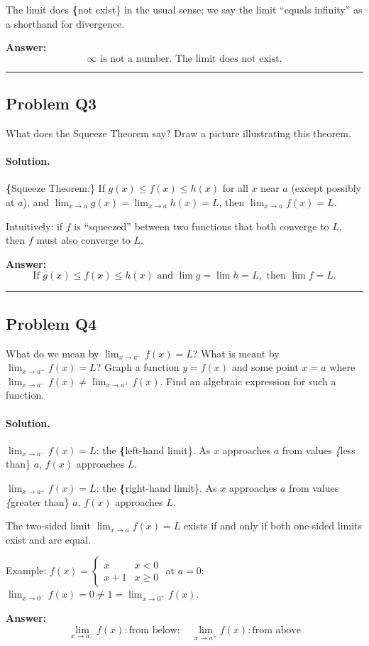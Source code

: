 \documentclass[12pt, a4paper]{article}
\newcommand{\problem}[1]{\subsection*{Problem #1}}
\newcommand{\solution}{\paragraph{Solution.}}
\begin{document}
The limit does \textbf\{not exist\} in the usual sense; we say the limit ``equals infinity'' as a shorthand for divergence.

\textbf{Answer:}
\[\infty \text{ is not a number. The limit does not exist.}\]

\vspace{1em}
\hrule
\vspace{1em}

\problem{Q3}

What does the Squeeze Theorem say? Draw a picture illustrating this theorem.

\solution

\textbf\{Squeeze Theorem:\} If $g(x) \le f(x) \le h(x)$ for all $x$ near $a$ (except possibly at $a$), and $\lim_{x \to a} g(x) = \lim_{x \to a} h(x) = L$, then $\lim_{x \to a} f(x) = L$.

Intuitively: if $f$ is ``squeezed'' between two functions that both converge to $L$, then $f$ must also converge to $L$.

\textbf{Answer:}
\[\text{If } g(x) \le f(x) \le h(x) \text{ and } \lim g = \lim h = L, \text{ then } \lim f = L.\]

\vspace{1em}
\hrule
\vspace{1em}

\problem{Q4}

What do we mean by $\lim_{x \to a^-} f(x) = L$? What is meant by $\lim_{x \to a^+} f(x) = L$? Graph a function $y = f(x)$ and some point $x = a$ where $\lim_{x \to a^-} f(x) \neq \lim_{x \to a^+} f(x)$. Find an algebraic expression for such a function.

\solution

$\lim_{x \to a^-} f(x) = L$: the \textbf\{left-hand limit\}. As $x$ approaches $a$ from values \emph\{less than\} $a$, $f(x)$ approaches $L$.

$\lim_{x \to a^+} f(x) = L$: the \textbf\{right-hand limit\}. As $x$ approaches $a$ from values \emph\{greater than\} $a$, $f(x)$ approaches $L$.

The two-sided limit $\lim_{x \to a} f(x) = L$ exists if and only if both one-sided limits exist and are equal.

Example: $f(x) = \begin{cases} x & x < 0 \\ x+1 & x \ge 0 \end{cases}$ at $a = 0$: $\lim_{x \to 0^-} f(x) = 0 \neq 1 = \lim_{x \to 0^+} f(x)$.

\textbf{Answer:}
\[\lim_{x \to a^-} f(x): \text{from below}; \quad \lim_{x \to a^+} f(x): \text{from above}\]
\end{document}
